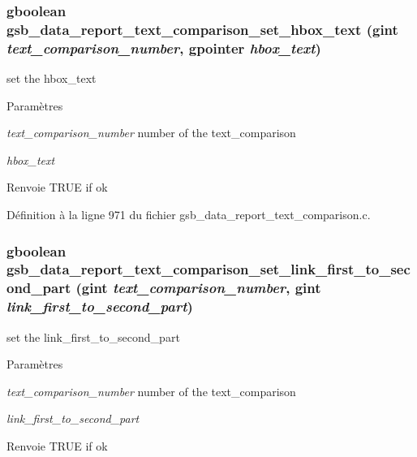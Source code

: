 \subsubsection[{gsb\_\-data\_\-report\_\-text\_\-comparison\_\-set\_\-hbox\_\-text}]{\setlength{\rightskip}{0pt plus 5cm}gboolean gsb\_\-data\_\-report\_\-text\_\-comparison\_\-set\_\-hbox\_\-text (gint {\em text\_\-comparison\_\-number}, \/  gpointer {\em hbox\_\-text})}\label{gsb__data__report__text__comparison_8c_a075e9be17ce49c0b71e1795cbe661991}
set the hbox\_\-text


\begin{DoxyParams}{Paramètres}
\item[{\em text\_\-comparison\_\-number}]number of the text\_\-comparison \item[{\em hbox\_\-text}]\end{DoxyParams}
\begin{DoxyReturn}{Renvoie}
TRUE if ok 
\end{DoxyReturn}


Définition à la ligne 971 du fichier gsb\_\-data\_\-report\_\-text\_\-comparison.c.

\subsubsection[{gsb\_\-data\_\-report\_\-text\_\-comparison\_\-set\_\-link\_\-first\_\-to\_\-second\_\-part}]{\setlength{\rightskip}{0pt plus 5cm}gboolean gsb\_\-data\_\-report\_\-text\_\-comparison\_\-set\_\-link\_\-first\_\-to\_\-second\_\-part (gint {\em text\_\-comparison\_\-number}, \/  gint {\em link\_\-first\_\-to\_\-second\_\-part})}\label{gsb__data__report__text__comparison_8c_a21e8035c4f8bec87320b814d6251a7d4}
set the link\_\-first\_\-to\_\-second\_\-part


\begin{DoxyParams}{Paramètres}
\item[{\em text\_\-comparison\_\-number}]number of the text\_\-comparison \item[{\em link\_\-first\_\-to\_\-second\_\-part}]\end{DoxyParams}
\begin{DoxyReturn}{Renvoie}
TRUE if ok 
\end{DoxyReturn}


